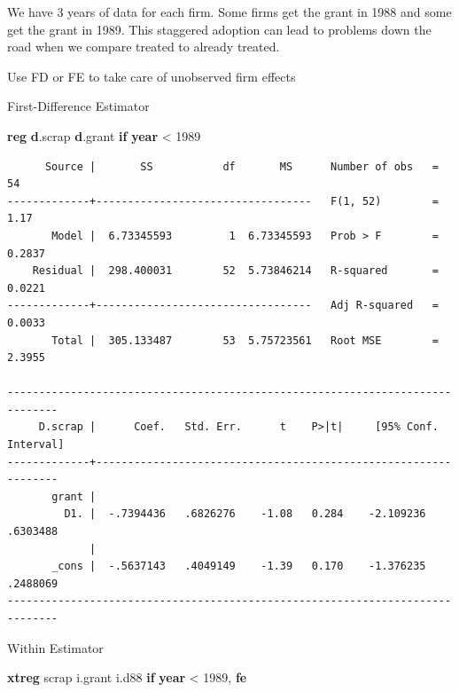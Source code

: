 \documentclass[
]{book}
\newenvironment{Shaded}{\begin{snugshade}}{\end{snugshade}}
\newcommand{\FunctionTok}[1]{\textcolor[rgb]{0.13,0.29,0.53}{\textbf{#1}}}
\newcommand{\KeywordTok}[1]{\textcolor[rgb]{0.13,0.29,0.53}{\textbf{#1}}}
\newcommand{\NormalTok}[1]{#1}
\begin{document}
We have 3 years of data for each firm. Some firms get the grant in 1988 and some get the grant in 1989. This staggered adoption can lead to problems down the road when we compare treated to already treated.

Use FD or FE to take care of unobserved firm effects

First-Difference Estimator

\begin{Shaded}
\begin{Highlighting}[]
\KeywordTok{reg} \KeywordTok{d}\NormalTok{.scrap }\KeywordTok{d}\NormalTok{.grant }\KeywordTok{if} \FunctionTok{year}\NormalTok{ \textless{} 1989}
\end{Highlighting}
\end{Shaded}

\begin{verbatim}
      Source |       SS           df       MS      Number of obs   =        54
-------------+----------------------------------   F(1, 52)        =      1.17
       Model |  6.73345593         1  6.73345593   Prob > F        =    0.2837
    Residual |  298.400031        52  5.73846214   R-squared       =    0.0221
-------------+----------------------------------   Adj R-squared   =    0.0033
       Total |  305.133487        53  5.75723561   Root MSE        =    2.3955

------------------------------------------------------------------------------
     D.scrap |      Coef.   Std. Err.      t    P>|t|     [95% Conf. Interval]
-------------+----------------------------------------------------------------
       grant |
         D1. |  -.7394436   .6826276    -1.08   0.284    -2.109236    .6303488
             |
       _cons |  -.5637143   .4049149    -1.39   0.170    -1.376235    .2488069
------------------------------------------------------------------------------
\end{verbatim}

Within Estimator

\begin{Shaded}
\begin{Highlighting}[]
\KeywordTok{xtreg}\NormalTok{ scrap i.grant i.d88 }\KeywordTok{if} \FunctionTok{year}\NormalTok{ \textless{} 1989, }\KeywordTok{fe}
\end{Highlighting}
\end{Shaded}
\end{document}

